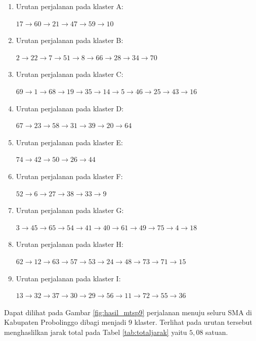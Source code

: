 \begin{enumerate}
\item Urutan perjalanan pada klaster A:

$17\rightarrow60\rightarrow21\rightarrow47\rightarrow59\rightarrow10$

\item Urutan perjalanan pada klaster B:

$2\rightarrow22\rightarrow7\rightarrow51\rightarrow8\rightarrow66\rightarrow28\rightarrow34\rightarrow70$

\item Urutan perjalanan pada klaster C:

$69\rightarrow1\rightarrow68\rightarrow19\rightarrow35\rightarrow14\rightarrow5\rightarrow46\rightarrow25\rightarrow43\rightarrow16$

\item Urutan perjalanan pada klaster D:

$67\rightarrow23\rightarrow58\rightarrow31\rightarrow39\rightarrow20\rightarrow64$

\item Urutan perjalanan pada klaster E:

$74\rightarrow42\rightarrow50\rightarrow26\rightarrow44$

\item Urutan perjalanan pada klaster F:

$52\rightarrow6\rightarrow27\rightarrow38\rightarrow33\rightarrow9$

\item Urutan perjalanan pada klaster G:

$3\rightarrow45\rightarrow65\rightarrow54\rightarrow41\rightarrow40\rightarrow61\rightarrow49\rightarrow75\rightarrow4\rightarrow18$

\item Urutan perjalanan pada klaster H:

$62\rightarrow12\rightarrow63\rightarrow57\rightarrow53\rightarrow24\rightarrow48\rightarrow73\rightarrow71\rightarrow15$

\item Urutan perjalanan pada klaster I:

$13\rightarrow32\rightarrow37\rightarrow30\rightarrow29\rightarrow56\rightarrow11\rightarrow72\rightarrow55\rightarrow36$

\end{enumerate}

Dapat dilihat pada Gambar \ref{fig:hasil_mtsp9} perjalanan menuju seluru SMA di Kabupaten Probolinggo dibagi menjadi 9 klaster. Terlihat pada urutan tersebut menghaslilkan jarak total pada Tabel \ref{tab:totaljarak} yaitu $5,08$ satuan.

